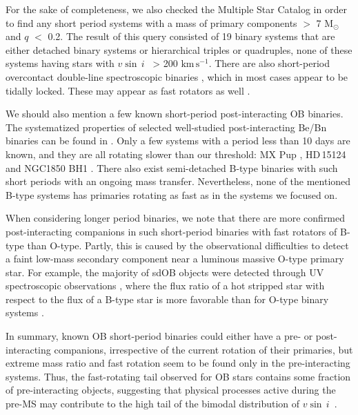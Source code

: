 \documentclass{aa}
\newcommand{\kms}{$\mathrm{km\,s^{-1}}$}
\newcommand{\vsini} {$v\sin\,i$}
\begin{document}
For the sake of completeness, we also checked the Multiple Star Catalog \citep{Tokovinin_2018} in order to find any short period systems with a mass of primary components $>$ 7 M$_{\odot}$ and $q$ $<$ 0.2.
The result of this query consisted of 19 binary systems that are either detached binary systems or hierarchical triples or quadruples, none of these systems having stars with \vsini~ > 200 \kms.
There are also short-period overcontact double-line spectroscopic
binaries \citep[see, e.g.][]{Abdul_Masih_2022}, which in most cases
appear to be tidally locked. These may appear as fast rotators as
well \citep[for example MY Cam and CC Cas, see][respectively]{Lorenzo_2014,Southworth_2022}.

We should also mention a few known short-period post-interacting OB binaries. The systematized properties of selected well-studied post-interacting Be/Bn binaries can be found in \citet{Harmanec_2015,Naze_2022_be,Schurman_2022, Wang_2023_stripped}.
Only a few systems with a period less than 10 days are known, and they are all rotating slower than our threshold: MX Pup \citep[\vsini~$\sim$ 120 \kms, $P$ $\sim$ 5.15 days,][]{Carrier_2002}, HD\,15124 \citep[\vsini~$\sim$ 95 \kms, $P$ $\sim$ 5.47 days, companion is a sdOB progenitor,][]{Badry_2022} and NGC1850 BH1 \citep[$P$ $\sim$ 5.04 days, which leads to \vsini~ $\sim$ 50 -- 70 \kms~ by assuming the period of ellipsoidal variability and $R$ $\sim$ 5--7 $R_{\odot}$, see][]{Badry_BH1,Saracino_2023}.
There also exist semi-detached B-type binaries with such short periods \citep[see Table 7 in][]{Harmanec_2015} with an ongoing mass transfer.
Nevertheless, none of the mentioned B-type systems has primaries rotating as fast as in the systems we focused on.

When considering longer period binaries, we note that there are more confirmed post-interacting companions in such short-period binaries with fast rotators of B-type than O-type.
Partly, this is caused by the observational difficulties to
detect a faint low-mass secondary component near a luminous massive O-type primary
star. For example, the majority of sdOB objects were detected through UV
spectroscopic observations \citep{Wang_2021}, where the flux ratio of
a hot stripped star with respect to the flux of a B-type star is
more favorable than for O-type binary systems \citep{Gotberg_2018}.



In summary, known OB short-period binaries could either have a pre- or
post-interacting companions, irrespective of the current rotation of
their primaries, but extreme mass ratio and fast rotation seem to be found only in the pre-interacting systems.
Thus, the fast-rotating tail observed for OB stars contains
some fraction of pre-interacting objects, suggesting that physical
  processes active during the pre-MS may contribute to the high tail of the
bimodal distribution of \vsini~\citep{vfts_2015_otype}.
\end{document}
